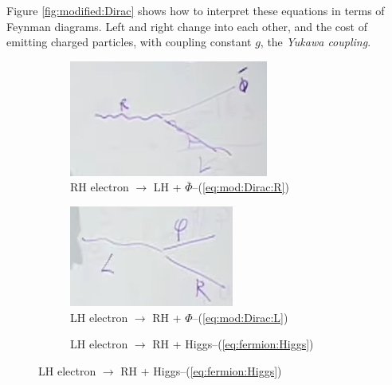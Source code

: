 \documentclass[]{article}
\begin{document}
 Figure \ref{fig:modified:Dirac} shows how to interpret these equations in terms of Feynman diagrams. Left and right change into each other, and the cost of emitting charged particles, with coupling constant $g$, the \emph{Yukawa coupling}.
 \begin{figure}[H]
 	\caption{Interpretation of modified Dirac equation}\label{fig:modified:Dirac}
 	\begin{subfigure}{0.3\textwidth}
 		\caption{RH electron $\rightarrow$ LH + $\bar{\Phi}$--(\ref{eq:mod:Dirac:R})}
 		\includegraphics[width=\textwidth]{2-9-RH}
 	\end{subfigure}
  	\begin{subfigure}{0.3\textwidth}
  		\caption{LH electron $\rightarrow$ RH + $\Phi$--(\ref{eq:mod:Dirac:L})}
	 	\includegraphics[width=\textwidth]{2-9-LH}
	 \end{subfigure}
   	\begin{subfigure}{0.3\textwidth}
 	\caption{LH electron $\rightarrow$ RH + Higgs--(\ref{eq:fermion:Higgs})}\label{fig:2-9-Higgs-boson}

\end{subfigure}
\end{figure}
\end{document}
